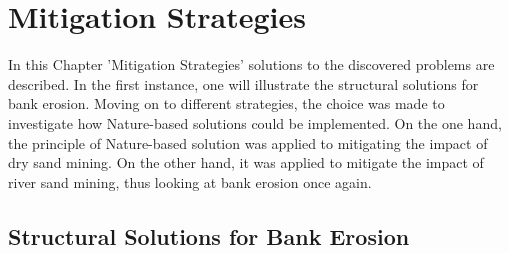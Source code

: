 \chapter{Mitigation Strategies}
\label{chap:mitigationstrats}

In this Chapter 'Mitigation Strategies' solutions to the discovered problems are described. In the first instance, one will illustrate the structural solutions for bank erosion. Moving on to different strategies, the choice was made to investigate how Nature-based solutions could be implemented. On the one hand, the principle of Nature-based solution was applied to mitigating the impact of dry sand mining. On the other hand, it was applied to mitigate the impact of river sand mining, thus looking at bank erosion once again. 

\section{Structural Solutions for Bank Erosion}
\label{section_8.2}

